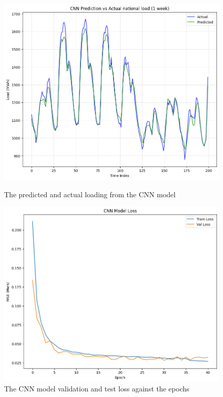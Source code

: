 \begin{figure}[h!]
	\centering
	\begin{minipage}[b]{0.46\linewidth}
	\includegraphics[width=\linewidth]{Chapters/images/results/cnn_predictionvsactual}
	\caption{The predicted and actual loading from the CNN model}
	\label{fig:cnnpredictionvsactual}
	\end{minipage}
	\begin{minipage}[b]{0.46\linewidth}
	\includegraphics[width=\linewidth]{Chapters/images/results/CNN_model_loss}
	\caption{The CNN model validation and test loss against the epochs}
	\label{fig:cnnmodelloss}
	\end{minipage}
\end{figure}

